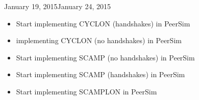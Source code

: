\documentclass[11pt, english, screen]{report-rd-info}
\begin{document}
\begin{fichesuivi}{January 19, 2015}{January 24, 2015}

   \begin{travaileffectue}
   \begin{itemize}
   \item {Start implementing CYCLON (handshakes) in PeerSim}
   \item {implementing CYCLON (no handshakes) in PeerSim}
      \end{itemize}
   \end{travaileffectue}

   \begin{travailnoneffectue}
   \end{travailnoneffectue}

   \begin{echange}
   \end{echange}

   \begin{planification}
   \begin{itemize}
   \item {Start implementing SCAMP (no handshakes) in PeerSim}
   \item {Start implementing SCAMP (handshakes) in PeerSim}
   \item {Start implementing SCAMPLON in PeerSim}
      \end{itemize}
   \end{planification}
\end{fichesuivi}
\end{document}

